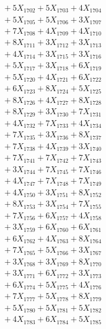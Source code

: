 \documentclass[a4paper,10pt]{article}
\begin{document}
{\begin{align}
&\;  + 5 X_{1702} + 5 X_{1703} + 4 X_{1704} \\[0.3ex]
&\;  + 5 X_{1705} + 5 X_{1706} + 3 X_{1707} \\[0.3ex]
&\;  + 7 X_{1708} + 4 X_{1709} + 4 X_{1710} \\[0.3ex]
&\;  + 8 X_{1711} + 3 X_{1712} + 3 X_{1713} \\[0.3ex]
&\;  + 4 X_{1714} + 3 X_{1715} + 3 X_{1716} \\[0.3ex]
&\;  + 5 X_{1717} + 3 X_{1718} + 6 X_{1719} \\[0.5ex]\allowbreak
&\;  + 5 X_{1720} + 4 X_{1721} + 6 X_{1722} \\[0.3ex]
&\;  + 6 X_{1723} + 8 X_{1724} + 5 X_{1725} \\[0.3ex]
&\;  + 8 X_{1726} + 4 X_{1727} + 8 X_{1728} \\[0.3ex]
&\;  + 8 X_{1729} + 3 X_{1730} + 7 X_{1731} \\[0.3ex]
&\;  + 4 X_{1732} + 7 X_{1733} + 4 X_{1734} \\[0.3ex]
&\;  + 7 X_{1735} + 3 X_{1736} + 8 X_{1737} \\[0.3ex]
&\;  + 7 X_{1738} + 4 X_{1739} + 3 X_{1740} \\[0.3ex]
&\;  + 7 X_{1741} + 7 X_{1742} + 7 X_{1743} \\[0.3ex]
&\;  + 3 X_{1744} + 7 X_{1745} + 7 X_{1746} \\[0.3ex]
&\;  + 4 X_{1747} + 7 X_{1748} + 7 X_{1749} \\[0.5ex]\allowbreak
&\;  + 4 X_{1750} + 3 X_{1751} + 8 X_{1752} \\[0.3ex]
&\;  + 8 X_{1753} + 3 X_{1754} + 7 X_{1755} \\[0.3ex]
&\;  + 7 X_{1756} + 6 X_{1757} + 4 X_{1758} \\[0.3ex]
&\;  + 3 X_{1759} + 6 X_{1760} + 6 X_{1761} \\[0.3ex]
&\;  + 6 X_{1762} + 4 X_{1763} + 8 X_{1764} \\[0.3ex]
&\;  + 7 X_{1765} + 5 X_{1766} + 3 X_{1767} \\[0.3ex]
&\;  + 3 X_{1768} + 3 X_{1769} + 8 X_{1770} \\[0.3ex]
&\;  + 3 X_{1771} + 6 X_{1772} + 3 X_{1773} \\[0.3ex]
&\;  + 6 X_{1774} + 5 X_{1775} + 4 X_{1776} \\[0.3ex]
&\;  + 7 X_{1777} + 5 X_{1778} + 8 X_{1779} \\[0.5ex]\allowbreak
&\;  + 5 X_{1780} + 5 X_{1781} + 5 X_{1782} \\[0.3ex]
&\;  + 4 X_{1783} + 6 X_{1784} + 5 X_{1785} \\[0.3ex]

\end{align}}
\end{document}

